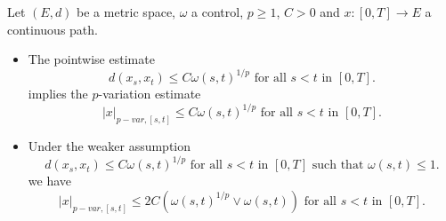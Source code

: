 \begin{proposition}
    Let $(E,d)$ be a metric space, $\omega$ a control, $p \geq 1$, $C>0$ and $x:[0,T] \rightarrow E$ a continuous path.
    \begin{itemize}
        \item The pointwise estimate 
        \begin{equation}
            d(x_s, x_t) \leq C \omega(s,t)^{1/p} \text{ for all } s < t \text{ in } [0,T].
        \end{equation}
        implies the $p$-variation estimate
        \begin{equation}
            |x|_{p-var, [s,t]} \leq C \omega(s,t)^{1/p} \text{ for all } s < t \text{ in } [0,T].
        \end{equation}
        \item Under the weaker assumption 
        \begin{equation}
            d(x_s, x_t) \leq C \omega(s, t)^{1/p} \text{ for all } s < t \text{ in } [0,T] \text{ such that } \omega(s,t) \leq 1.
        \end{equation}
        we have
        \begin{equation}
            |x|_{p-var, [s,t]} \leq 2 C \left( \omega(s,t)^{1/p} \vee \omega(s,t) \right) \text{ for all } s < t \text{ in } [0,T].
        \end{equation}
    \end{itemize}
\end{proposition}